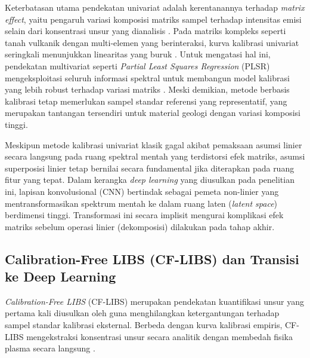 Keterbatasan utama pendekatan univariat adalah kerentanannya terhadap \textit{matrix effect}, yaitu pengaruh variasi komposisi matriks sampel terhadap intensitas emisi selain dari konsentrasi unsur yang dianalisis \citep{safi_multivariate_2018, lu_calibration_2019}. Pada matriks kompleks seperti tanah vulkanik dengan multi-elemen yang berinteraksi, kurva kalibrasi univariat seringkali menunjukkan linearitas yang buruk \citep{gomez_matrix_2018}. Untuk mengatasi hal ini, pendekatan multivariat seperti \textit{Partial Least Squares Regression} (PLSR) mengeksploitasi seluruh informasi spektral untuk membangun model kalibrasi yang lebih robust terhadap variasi matriks \citep{zhang_partial_2020}. Meski demikian, metode berbasis kalibrasi tetap memerlukan sampel standar referensi yang representatif, yang merupakan tantangan tersendiri untuk material geologi dengan variasi komposisi tinggi.

Meskipun metode kalibrasi univariat klasik gagal akibat pemaksaan asumsi linier secara langsung pada ruang spektral mentah yang terdistorsi efek matriks, asumsi superposisi linier tetap bernilai secara fundamental jika diterapkan pada ruang fitur yang tepat. Dalam kerangka \textit{deep learning} yang diusulkan pada penelitian ini, lapisan konvolusional (CNN) bertindak sebagai pemeta non-linier yang mentransformasikan spektrum mentah ke dalam ruang laten (\textit{latent space}) berdimensi tinggi. Transformasi ini secara implisit mengurai komplikasi efek matriks sebelum operasi linier (dekomposisi) dilakukan pada tahap akhir.

\subsection{Calibration-Free LIBS (CF-LIBS) dan Transisi ke Deep Learning}

\textit{Calibration-Free LIBS} (CF-LIBS) merupakan pendekatan kuantifikasi unsur yang pertama kali diusulkan oleh \citet{ciucci_new_1999} guna menghilangkan ketergantungan terhadap sampel standar kalibrasi eksternal. Berbeda dengan kurva kalibrasi empiris, CF-LIBS mengekstraksi konsentrasi unsur secara analitik dengan membedah fisika plasma secara langsung \citep{cremers_handbook_nodate, cristoforetti_local_2010}. 

